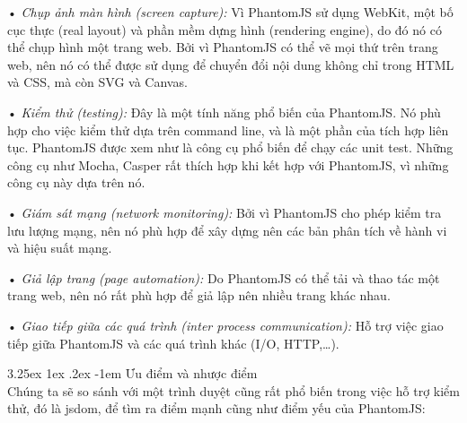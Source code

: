 \documentclass[12pt,a4paper]{article}
\makeatletter
\newcommand{\myparagraph}[1]{\paragraph{#1}\mbox{}\\} %
\renewcommand\paragraph{\@startsection{paragraph}{5}{\z@}%
  {3.25ex \@plus1ex \@minus.2ex}%
  {-1em}%
  {\normalfont\normalsize\bfseries}}
\makeatother
\begin{document}
\begin{list}{}{}
\item[•] \emph{Chụp ảnh màn hình (screen capture):} Vì PhantomJS sử dụng WebKit, một bố cục thực (real layout) và phần mềm dựng hình (rendering engine), do đó nó có thể chụp hình một trang web. Bởi vì PhantomJS có thể vẽ mọi thứ trên trang web, nên nó có thể được sử dụng để chuyển đổi nội dung không chỉ trong HTML và CSS, mà còn SVG và Canvas.
\item[•] \emph{Kiểm thử (testing):} Đây là một tính năng phổ biến của PhantomJS. Nó phù hợp cho việc kiểm thử dựa trên command line, và là một phần của tích hợp liên tục. PhantomJS được xem như là công cụ phổ biến để chạy các unit test. Những công cụ như Mocha, Casper rất thích hợp khi kết hợp với PhantomJS, vì những công cụ này dựa trên nó.
\item[•] \emph{Giám sát mạng (network monitoring):} Bởi vì PhantomJS cho phép kiểm tra lưu lượng mạng, nên nó phù hợp để xây dựng nên các bản phân tích về hành vi và hiệu suất mạng.
\item[•] \emph{Giả lập trang (page automation):} Do PhantomJS có thể tải và thao tác một trang web, nên nó rất phù hợp để giả lập nên nhiều trang khác nhau.
\item[•] \emph{Giao tiếp giữa các quá trình (inter process communication):} Hỗ trợ việc giao tiếp giữa PhantomJS và các quá trình khác (I/O, HTTP,…).
\end{list}

\myparagraph{Ưu điểm và nhược điểm}
Chúng ta sẽ so sánh với một trình duyệt cũng rất phổ biến trong việc hỗ trợ kiểm thử, đó là jsdom, để tìm ra điểm mạnh cũng như điểm yếu của PhantomJS:
\end{document}
